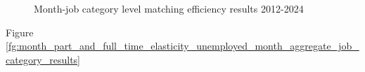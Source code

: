 \documentclass[12pt]{article}
\begin{document}
\begin{figure}[!ht]
\begin{center}
  \caption{Month-job category level matching efficiency results 2012-2024}
  \label{fg:month_part_and_full_time_matching_efficiency_job_category_results} 
  \end{center}
  \footnotesize
\end{figure} 

Figure \ref{fg:month_part_and_full_time_elasticity_unemployed_month_aggregate_job_category_results}
\end{document}

